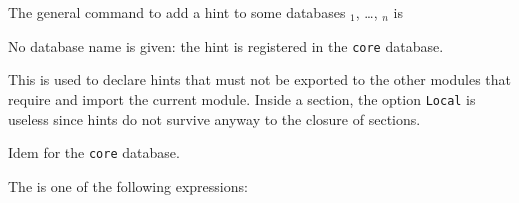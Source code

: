 The general
command to add a hint to some databases \ident$_1$, \dots, \ident$_n$ is
\begin{tabbing}
  {}
\end{tabbing}

\begin{Variants}
\item {}

  No database name is given: the hint is registered in the {\tt core}
    database.

\item {}

  This is used to declare hints that must not be exported to the other
  modules that require and import the current module. Inside a
  section, the option {\tt Local} is useless since hints do not
  survive anyway to the closure of sections.

\item {}

  Idem for the {\tt core} database.

\end{Variants}

The {\hintdef} is one of the following expressions:

\newcommand{\cchintdef}[1]{\vernacdef{\zeroone{Local} Hint #1\zeroone{ : \ident$_1$ \mbox{\dots} \ident$_n$}}}

